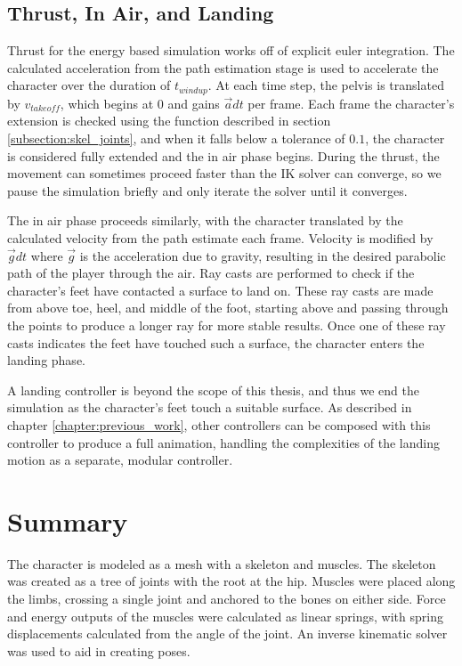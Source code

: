 \subsection{Thrust, In Air, and Landing}
\label{subsection:energy_thrust}
Thrust for the energy based simulation works off of explicit euler integration.  The calculated acceleration from the path estimation stage is used to accelerate the character over the duration of $t_{windup}$.  At each time step, the pelvis is translated by $v_{takeoff}$, which begins at 0 and gains $\vec{a} dt$ per frame.  Each frame the character's extension is checked using the function described in section \ref{subsection:skel_joints}, and when it falls below a tolerance of $0.1$, the character is considered fully extended and the in air phase begins.  During the thrust, the movement can sometimes proceed faster than the IK solver can converge, so we pause the simulation briefly and only iterate the solver until it converges.

The in air phase proceeds similarly, with the character translated by the calculated velocity from the path estimate each frame.  Velocity is modified by $\vec{g} dt$ where $\vec{g}$ is the acceleration due to gravity, resulting in the desired parabolic path of the player through the air.  Ray casts are performed to check if the character's feet have contacted a surface to land on.  These ray casts are made from above toe, heel, and middle of the foot, starting above and passing through the points to produce a longer ray for more stable results.  Once one of these ray casts indicates the feet have touched such a surface, the character enters the landing phase.

A landing controller is beyond the scope of this thesis, and thus we end the simulation as the character's feet touch a suitable surface.  As described in chapter \ref{chapter:previous_work}, other controllers can be composed with this controller to produce a full animation, handling the complexities of the landing motion as a separate, modular controller.

\section{Summary}
\label{subsection:animation_summary}
The character is modeled as a mesh with a skeleton and muscles.   The skeleton was created as a tree of joints with the root at the hip.  Muscles were placed along the limbs, crossing a single joint and anchored to the bones on either side.  Force and energy outputs of the muscles were calculated as linear springs, with spring displacements calculated from the angle of the joint.  An inverse kinematic solver was used to aid in creating poses.

